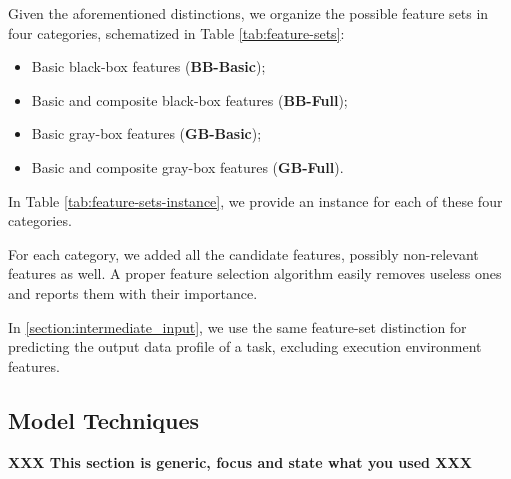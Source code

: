\documentclass[a4paper, 10pt, conference]{ieeeconf}      %
\begin{document}


Given the aforementioned distinctions, we organize the possible feature sets in four categories, schematized in Table \ref{tab:feature-sets}: 
\begin{itemize}
    \item Basic black-box features (\textbf{BB-Basic});
    \item Basic and composite black-box features (\textbf{BB-Full});
     \item Basic gray-box features (\textbf{GB-Basic});
    \item Basic and composite gray-box features (\textbf{GB-Full}).
\end{itemize}
In Table \ref{tab:feature-sets-instance}, we provide an instance for each of these four categories.

For each category, we added all the candidate features, possibly non-relevant features as well. A proper feature selection algorithm easily removes useless ones and reports them with their importance.   

In \ref{section:intermediate_input}, we use the same feature-set distinction for predicting the output data profile of a task, excluding execution environment features.

\subsection{Model Techniques}

\textbf{XXX This section is generic, focus and state what you used XXX}
\end{document}
